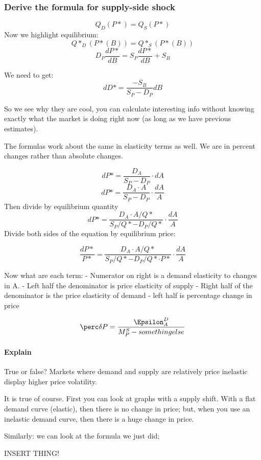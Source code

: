 \documentclass[
]{book}
\begin{document}
\hypertarget{derive-the-formula-for-supply-side-shock}{%
\subsubsection{Derive the formula for supply-side shock}\label{derive-the-formula-for-supply-side-shock}}

\[Q_D(P*) = Q_S(P*)\]
Now we highlight equilibrium:
\[Q*_D(P*(B)) = Q*_S(P*(B))\]
\[D_P \frac{dP*}{dB} = S_P \frac{dP*}{dB} + S_B\]

We need to get:
\[dD* = \frac{-S_B}{S_P - D_P}dB\]

So we see why they are cool, you can calculate interesting info without knowing exactly what the market is doing right now (as long as we have previous estimates).

The formulas work about the same in elasticity terms as well. We are in percent changes rather than absolute changes.

\[dP* = \frac{D_A}{S_P - D_P} \cdot dA\]
\[dP* = \frac{D_A \cdot A}{S_P - D_P} \cdot \frac{dA}{A}\]
Then divide by equilibrium quantity
\[dP* = \frac{D_A \cdot A/Q*}{S_P/Q* - D_P/Q*} \cdot \frac{dA}{A}\]
Divide both sides of the equation by equilibrium price:

\[\frac{dP*}{P*} = \frac{D_A \cdot A/Q*}{S_P/Q* - D_P/Q* \cdot P*} \cdot \frac{dA}{A}\]

Now what are each term:
- Numerator on right is a demand elasticity to changes in A.
- Left half the denominator is price elasticity of supply
- Right half of the denominator is the price elasticity of demand
- left half is percentage change in price

\[ \perc \delta P = \frac{\Epsilon_A^D}{M_P^S - something else}\]

\hypertarget{explain}{%
\paragraph{Explain}\label{explain}}

True or false? Markets where demand and supply are relatively price inelastic display higher price volatility.

It is true of course. First you can look at graphs with a supply shift. With a flat demand curve (elastic), then there is no change in price; but, when you use an inelastic demand curve, then there is a huge change in price.

Similarly: we can look at the formula we just did;

INSERT THING!
\end{document}
